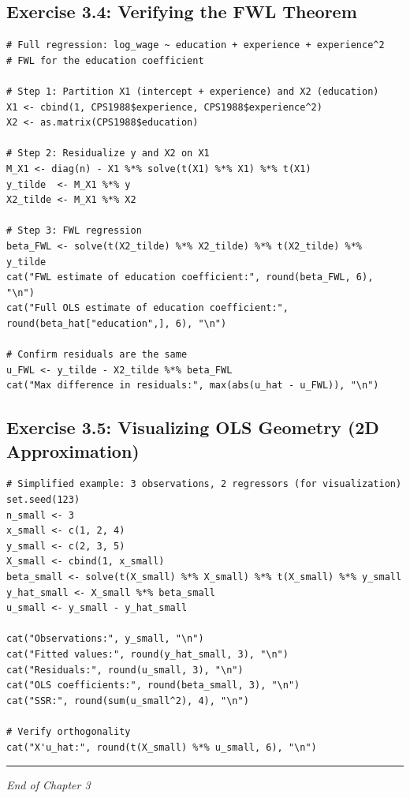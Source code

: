 \subsection{Exercise 3.4: Verifying the FWL Theorem}

\begin{lstlisting}
# Full regression: log_wage ~ education + experience + experience^2
# FWL for the education coefficient

# Step 1: Partition X1 (intercept + experience) and X2 (education)
X1 <- cbind(1, CPS1988$experience, CPS1988$experience^2)
X2 <- as.matrix(CPS1988$education)

# Step 2: Residualize y and X2 on X1
M_X1 <- diag(n) - X1 %*% solve(t(X1) %*% X1) %*% t(X1)
y_tilde  <- M_X1 %*% y
X2_tilde <- M_X1 %*% X2

# Step 3: FWL regression
beta_FWL <- solve(t(X2_tilde) %*% X2_tilde) %*% t(X2_tilde) %*% y_tilde
cat("FWL estimate of education coefficient:", round(beta_FWL, 6), "\n")
cat("Full OLS estimate of education coefficient:", round(beta_hat["education",], 6), "\n")

# Confirm residuals are the same
u_FWL <- y_tilde - X2_tilde %*% beta_FWL
cat("Max difference in residuals:", max(abs(u_hat - u_FWL)), "\n")
\end{lstlisting}

\subsection{Exercise 3.5: Visualizing OLS Geometry (2D Approximation)}

\begin{lstlisting}
# Simplified example: 3 observations, 2 regressors (for visualization)
set.seed(123)
n_small <- 3
x_small <- c(1, 2, 4)
y_small <- c(2, 3, 5)
X_small <- cbind(1, x_small)
beta_small <- solve(t(X_small) %*% X_small) %*% t(X_small) %*% y_small
y_hat_small <- X_small %*% beta_small
u_small <- y_small - y_hat_small

cat("Observations:", y_small, "\n")
cat("Fitted values:", round(y_hat_small, 3), "\n")
cat("Residuals:", round(u_small, 3), "\n")
cat("OLS coefficients:", round(beta_small, 3), "\n")
cat("SSR:", round(sum(u_small^2), 4), "\n")

# Verify orthogonality
cat("X'u_hat:", round(t(X_small) %*% u_small, 6), "\n")
\end{lstlisting}

\medskip\hrule\medskip

\textit{End of Chapter 3}

